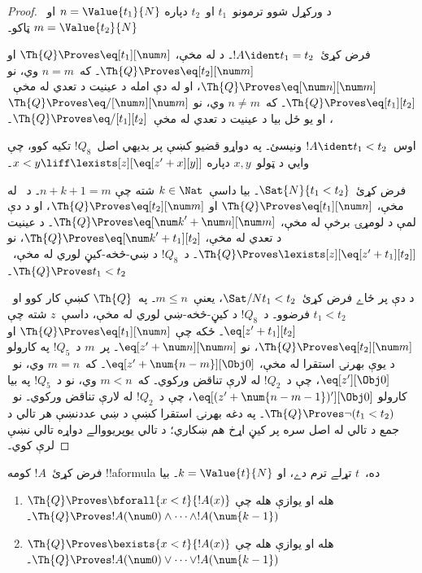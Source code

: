 \documentclass[../../../include/open-logic-section]{subfiles}
\begin{document}
\begin{proof}
د ورکړل شوو ترمونو~$t_1$ او~$t_2$ دپاره
$n = \Value{t_1}{N}$ او~$m = \Value{t_2}{N}$ ټاکو۔

فرض کړئ~$!A \ident t_1 = t_2$۔ د
 له مخې،
$\Th{Q} \Proves \eq[t_1][\num n]$ او
$\Th{Q} \Proves \eq[t_2][\num m]$۔ که~$n = m$ وي، نو
$\Th{Q} \Proves \eq[\num n][\num m]$، او له دې امله د عينيت د
تعدي له مخې~$\Th{Q} \Proves \eq[t_1][t_2]$۔ که~$n \neq m$ وي، نو
$\Th{Q} \Proves \eq/[\num n][\num m]$، او يو ځل بيا د عينيت د
تعدي له مخې~$\Th{Q} \Proves \eq/[t_1][t_2]$۔

اوس~$!A \ident t_1 < t_2$ ونيسئ۔ په دواړو قضيو کښې پر بديهي
اصل~$!Q_8$ تکيه کوو، چې وايي د ټولو~$x,y$ دپاره
$x < y \liff \lexists[z][\eq[z' + x][y]]$۔

فرض کړئ~$\Sat{N}{t_1 < t_2}$۔ بيا داسې~$k \in \Nat$ شته چې
$n + k + 1 = m$۔ د~ له مخې،
$\Th{Q} \Proves \eq[t_1][\num n]$ او
$\Th{Q} \Proves \eq[t_2][\num m]$، او د دې لمې د لومړۍ برخې له
مخې، $\Th{Q} \Proves \eq[{\num k}' + \num n][\num m]$۔ د عينيت د
تعدي له مخې، $\Th{Q} \Proves \eq[{\num k}' + t_1][t_2]$، نو
$\Th{Q} \Proves \lexists[z][\eq[z' + t_1][t_2]]$۔ د~$!Q_8$ د
ښي-څخه-کيڼ لوري له مخې،~$\Th{Q} \Proves t_1 < t_2$۔

د دې پر ځاے فرض کړئ~$\Sat/{N}{t_1 < t_2}$، يعنې~$m \leq n$۔
%
په~$\Th{Q}$ کښې کار کوو او~$t_1 < t_2$ فرضوو۔ د~$!Q_8$ د
کيڼ-څخه-ښي لوري له مخې، داسې~$z$ شته چې
$\eq[z' + t_1][t_2]$۔ ځکه چې
$\Th{Q} \Proves \eq[t_1][\num n]$ او
$\Th{Q} \Proves \eq[t_2][\num m]$، نو
$\eq[z' + \num n][\num m]$۔
%
پر~$m$ د~$!Q_5$ په کارولو د يوې بهرنۍ استقرا له مخې،
$\eq[z' + \num{n - m}][\Obj 0]$۔
که~$m = n$ وي، نو~$\eq[z'][\Obj 0]$، چې د~$!Q_2$ له لارې تناقض
ورکوي۔ که~$m < n$ وي، نو د~$!Q_5$ په بيا کارولو
$\eq[(z' + \num{n - m - 1})'][\Obj 0]$، چې د~$!Q_2$ له لارې
تناقض ورکوي۔ نو~$\Th{Q} \Proves \lnot(t_1 < t_2)$۔ په دغه بهرنۍ استقرا کښې د ښي عددنښې هر تالي د جمع د تالي له اصل سره پر کيڼ اړخ هم ښکاري؛ د تالي يوپر‌يووالے دواړه تالي نښې لرې کوي۔
\end{proof}

\begin{lem}
فرض کړئ~$!A$ کومه !!a{formula} ده،~$t$ تړلے ترم دے، او
$k=\Value{t}{N}$۔ بيا
\begin{enumerate}
\item $\Th{Q} \Proves \bforall{x<t}{!A(x)}$ هله او يوازې هله چې
$\Th{Q} \Proves !A(\num 0) \land \dots \land !A(\num{k-1})$۔
\item $\Th{Q} \Proves \bexists{x<t}{!A(x)}$ هله او يوازې هله چې
$\Th{Q} \Proves !A(\num 0) \lor \dots \lor !A(\num{k-1})$۔
\end{enumerate}
\end{lem}
\end{document}
